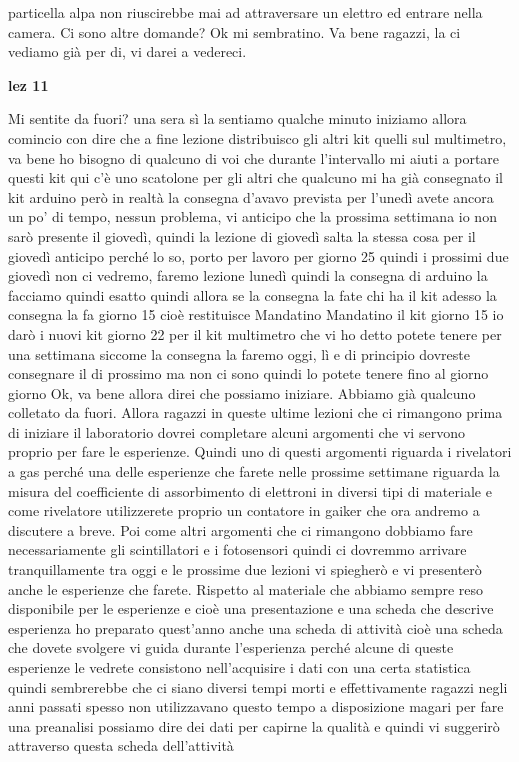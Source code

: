 {particella alpa non riuscirebbe mai ad attraversare un elettro ed entrare nella camera. Ci sono altre domande? Ok mi sembratino. Va bene ragazzi, la ci vediamo già per di, vi darei a vedereci.

\textbf{lez 11}

Mi sentite da fuori? una sera sì la sentiamo qualche minuto iniziamo allora comincio con dire che a fine lezione distribuisco gli altri kit quelli sul multimetro, va bene ho bisogno di qualcuno di voi che durante l'intervallo mi aiuti a portare questi kit qui c'è uno scatolone per gli altri che qualcuno mi ha già consegnato il kit arduino però in realtà la consegna d'avavo prevista per l'unedì avete ancora un po' di tempo, nessun problema, vi anticipo che la prossima settimana io non sarò presente il giovedì, quindi la lezione di giovedì salta la stessa cosa per il giovedì anticipo perché lo so, porto per lavoro per giorno 25 quindi i prossimi due giovedì non ci vedremo, faremo lezione lunedì quindi la consegna di arduino la facciamo quindi esatto quindi allora se la consegna la fate chi ha il kit adesso la consegna la fa giorno 15 cioè restituisce Mandatino Mandatino il kit giorno 15 io darò i nuovi kit giorno 22 per il kit multimetro che vi ho detto potete tenere per una settimana siccome la consegna la faremo oggi, lì e di principio dovreste consegnare il di prossimo ma non ci sono quindi lo potete tenere fino al giorno giorno Ok, va bene allora direi che possiamo iniziare. Abbiamo già qualcuno colletato da fuori. Allora ragazzi in queste ultime lezioni che ci rimangono prima di iniziare il laboratorio dovrei completare alcuni argomenti che vi servono proprio per fare le esperienze. Quindi uno di questi argomenti riguarda i rivelatori a gas perché una delle esperienze che farete nelle prossime settimane riguarda la misura del coefficiente di assorbimento di elettroni in diversi tipi di materiale e come rivelatore utilizzerete proprio un contatore in gaiker che ora andremo a discutere a breve. Poi come altri argomenti che ci rimangono dobbiamo fare necessariamente gli scintillatori e i fotosensori quindi ci dovremmo arrivare tranquillamente tra oggi e le prossime due lezioni vi spiegherò e vi presenterò anche le esperienze che farete. Rispetto al materiale che abbiamo sempre reso disponibile per le esperienze e cioè una presentazione e una scheda che descrive esperienza ho preparato quest'anno anche una scheda di attività cioè una scheda che dovete svolgere vi guida durante l'esperienza perché alcune di queste esperienze le vedrete consistono nell'acquisire i dati con una certa statistica quindi sembrerebbe che ci siano diversi tempi morti e effettivamente ragazzi negli anni passati spesso non utilizzavano questo tempo a disposizione magari per fare una preanalisi possiamo dire dei dati per capirne la qualità e quindi vi suggerirò attraverso questa scheda dell'attività 

}

